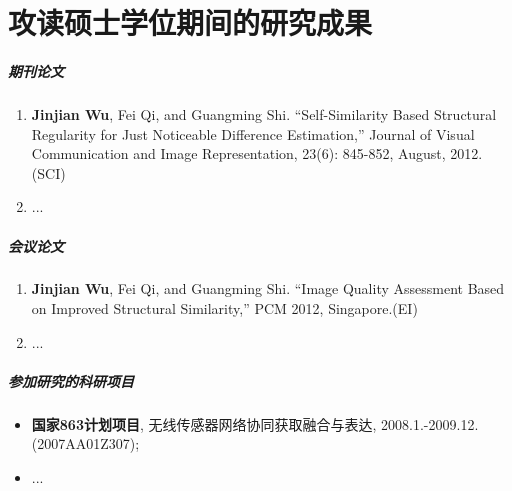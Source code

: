 
\chapter*{攻读硕士学位期间的研究成果}
\label{char:achi}

\paragraph{期刊论文}

\begin{enumerate}
\item \textbf{Jinjian Wu}, Fei Qi, and Guangming Shi. “Self-Similarity Based Structural Regularity for Just Noticeable Difference Estimation,” Journal of Visual Communication and Image Representation, 23(6): 845-852, August, 2012.(SCI)

\item ...
\end{enumerate}

\paragraph{会议论文}
\begin{enumerate}
\item \textbf{Jinjian Wu}, Fei Qi, and Guangming Shi. “Image Quality Assessment Based on Improved Structural Similarity,” PCM 2012, Singapore.(EI)

\item ...
\end{enumerate}


\paragraph{参加研究的科研项目}

\begin{itemize}
\item 
\textbf{国家863计划项目}, 无线传感器网络协同获取融合与表达, 2008.1.-2009.12. (2007AA01Z307);
\item ...
\end{itemize}

